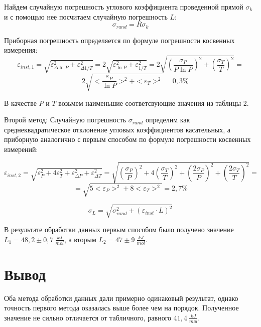 \documentclass[14pt, a4paper]{report}
\begin{document}
Найдем случайную погрешность углового коэффициента проведенной прямой $\sigma_k$ и с помощью нее посчитаем случайную погрешность $L$:
\[\sigma_{rand}=R\sigma_k\]

Приборная погрешность определяется по формуле погрешности косвенных измерения:
\[\varepsilon_{inst, 1}=\sqrt{\varepsilon_{\Delta \ln P}^2+\varepsilon_{\Delta 1/T}^2}=2\sqrt{\varepsilon_{\ln P}^2+\varepsilon_{1/T}^2}=2\sqrt{\left(\frac{\sigma_{P}}{P\ln P}\right)^2+\left(\frac{\sigma_T}{T}\right)^2}=\]
\[=2\sqrt{<\frac{\varepsilon_{P}}{\ln P}>^2+<\varepsilon_{T}>^2}=0,3\%\]

В качестве $P$ и $T$ возьмем наименьшие соответсвующие значения из таблицы 2.

Второй метод:
Случайную погрешность $\sigma_{rand}$ определим как среднеквадратическое отклонение угловых коэффициентов касательных, а приборную аналогично с первым способом по формуле погрешности косвенных измерений:

\[\varepsilon_{inst, 2}=\sqrt{\varepsilon_P^2+4\varepsilon_T^2+\varepsilon_{\Delta P}^2+\varepsilon_{\Delta T}^2}=\sqrt{\left(\frac{\sigma_P}{P}\right)^2+4\left(\frac{\sigma_T}{T}\right)^2+\left(\frac{2\sigma_P}{P}\right)^2+\left(\frac{2\sigma_T}{T}\right)^2}=\]
\[=\sqrt{5<\varepsilon_P>^2+8<\varepsilon_T>^2}=2,7\%\]

\[\sigma_L=\sqrt{\sigma^2_{rand}+(\varepsilon_{inst}\cdot L)^2}\]

В результате обработки данных первым способом было получено значение $L_1=48,2\pm0,7\ \frac{kJ}{mol}$, а вторым $L_2=47\pm9\ \frac{kJ}{mol}$.

\section{Вывод}

Оба метода обработки данных дали примерно одинаковый результат, однако точность первого метода оказалась выше более чем на порядок. Полученное значение не сильно отличается от табличного, равного $41,4\ \frac{kJ}{mol}$.
\end{document}
